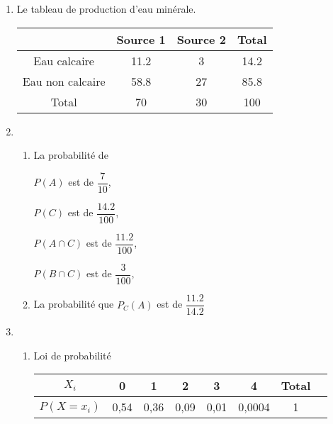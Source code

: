 \documentclass[12pt,a4paper]{article}
\begin{document}
\begin{center}
        \shadowbox{\begin{large}
                \textcolor{black}{Exercice de maths}
        \end{large}}
    \end{center}
    \vspace{0.5 cm}
\begin{enumerate}
	\item Le tableau de production d'eau minérale. 
	\begin{table}[ht]
   		\centering
   		\begin{tabular}{|c|c|c|c|}
  			\hline
			 					& Source 1 	& Source 2 	& Total 	\\
		   \hline 
			Eau calcaire 		& 11.2 		& 3 		& 14.2		\\
			\hline
			Eau non calcaire 	& 58.8		& 27		& 85.8		\\
		   \hline
			Total 				& 70 		& 30  		& 100  		\\
		   \hline

   		\end{tabular}
	\end{table}
\item \begin{enumerate}
	\item La probabilité de\par
			$P(A)$ est de $\dfrac{7}{10}$,\par
			$P(C)$ est de $\dfrac{14.2}{100}$,\par
			$P(A\cap C)$ est de $\dfrac{11.2}{100}$,\par
			$P(B \cap C)$ est de $\dfrac{3}{100}$,\par
	\item	La probabilité que $P_C(A)$ est de $\dfrac{11.2}{14.2}$
\end{enumerate}
    \vspace{0.5 cm}
\item
	\begin{enumerate}
	\item Loi de probabilité 
		\begin{table}[ht]
        \centering
        \begin{tabular}{|c|c|c|c|c|c|c|c|}
            \hline
            $X_i$                    & 0  		& 1  	& 2		&	3	&	4	& Total     \\
           \hline
           $P(X=x_i)$ 			     &  0,54    & 0,36     &  0,09 & 	0,01	& 0,0004		&  1  \\
           \hline


\end{tabular}
\end{table}
\end{enumerate}
\end{enumerate}
\end{document}
